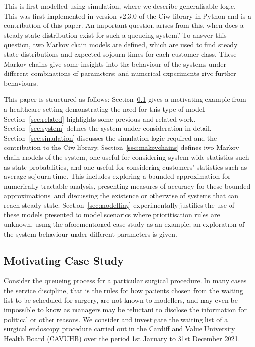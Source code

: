 \documentclass{article}
\begin{document}
This is first modelled using simulation, where we describe generalisable logic.
This was first implemented in version v2.3.0 of the Ciw library in Python
\cite{palmer19} and is a contribution of this paper.
An important question arises from this, when does a steady state distribution
exist for such a queueing system? To answer this question, two Markov chain
models are defined, which are used to find
steady state distributions and expected sojourn times for each customer class.
These Markov chains give some insights into the behaviour of the systems under
different combinations of parameters; and numerical experiments give further
behaviours.

This paper is structured as follows:
Section~\ref{sec:casestudy} gives a motivating example from a healthcare
setting demonstrating the need for this type of model.
Section~\ref{sec:related} highlights some previous and related work.
Section~\ref{sec:system} defines the system under consideration in detail.
Section~\ref{sec:simulation} discusses the simulation logic required and the
contribution to the Ciw library.
Section~\ref{sec:makovchains} defines two Markov chain models of the system, one
useful for considering system-wide statistics such as state probabilities, and
one useful for considering customers' statistics such as average sojourn time.
This includes exploring a bounded approximation for numerically tractable
analysis, presenting measures of accuracy for these bounded approximations, and
discussing the existence or otherwise of systems that can reach steady state.
Section~\ref{sec:modelling} experimentally justifies the use of these models
presented to model scenarios where prioritisation rules are unknown, using the
aforementioned case study as an example; an exploration of the system behaviour
under different parameters is given.

\subsection{Motivating Case Study}\label{sec:casestudy}
Consider the queueing process for a particular surgical procedure. In many cases
the service discipline, that is the rules for how patients chosen from the
waiting list to be scheduled for surgery, are not known to modellers, and may
even be impossible to know as managers may be reluctant to disclose the
information for political or other reasons.
We consider and investigate the waiting list of a surgical
endoscopy procedure carried out in the Cardiff and Value University Health Board
(CAVUHB) over the period 1st January to 31st December 2021.
\end{document}
